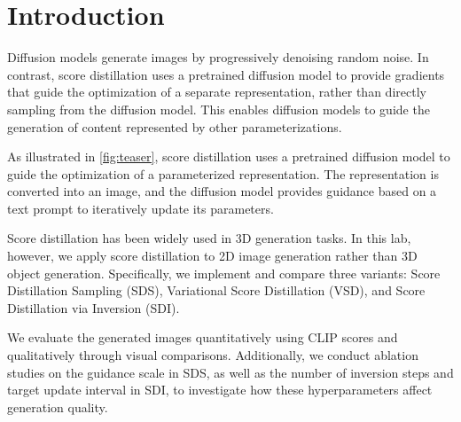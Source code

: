 \section{Introduction}
\label{sec:intro}

Diffusion models generate images by progressively denoising random noise. In contrast, score distillation uses a pretrained diffusion model to provide gradients that guide the optimization of a separate representation, rather than directly sampling from the diffusion model. This enables diffusion models to guide the generation of content represented by other parameterizations.

As illustrated in \cref{fig:teaser}, score distillation uses a pretrained diffusion model to guide the optimization of a parameterized representation. The representation is converted into an image, and the diffusion model provides guidance based on a text prompt to iteratively update its parameters. 

Score distillation has been widely used in 3D generation tasks. In this lab, however, we apply score distillation to 2D image generation rather than 3D object generation. Specifically, we implement and compare three variants: Score Distillation Sampling (SDS), Variational Score Distillation (VSD), and Score Distillation via Inversion (SDI). 

We evaluate the generated images quantitatively using CLIP scores and qualitatively through visual comparisons. Additionally, we conduct ablation studies on the guidance scale in SDS, as well as the number of inversion steps and target update interval in SDI, to investigate how these hyperparameters affect generation quality.
